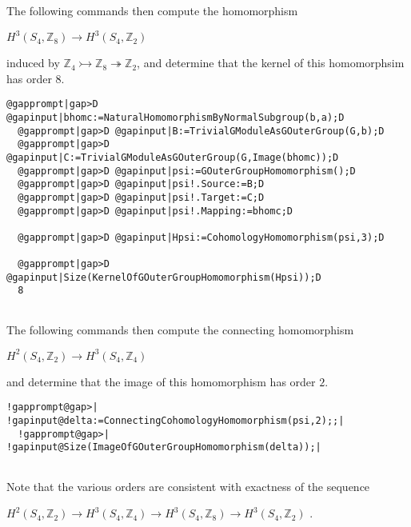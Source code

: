 \documentclass[a4paper,11pt]{report}
\begin{document}
{{\begin{Verbatim}[commandchars=@|D,fontsize=\small,frame=single,label=Example]
\end{Verbatim}
 

 The following commands then compute the homomorphism 

$H^3(S_4,\mathbb Z_8) \rightarrow H^3(S_4,\mathbb Z_2)$ 

induced by $\mathbb Z_4 \rightarrowtail \mathbb Z_8 \twoheadrightarrow \mathbb Z_2$, and determine that the kernel of this homomorphsim has order $8$. 
\begin{Verbatim}[commandchars=@|D,fontsize=\small,frame=single,label=Example]
  @gapprompt|gap>D @gapinput|bhomc:=NaturalHomomorphismByNormalSubgroup(b,a);D
  @gapprompt|gap>D @gapinput|B:=TrivialGModuleAsGOuterGroup(G,b);D
  @gapprompt|gap>D @gapinput|C:=TrivialGModuleAsGOuterGroup(G,Image(bhomc));D
  @gapprompt|gap>D @gapinput|psi:=GOuterGroupHomomorphism();D
  @gapprompt|gap>D @gapinput|psi!.Source:=B;D
  @gapprompt|gap>D @gapinput|psi!.Target:=C;D
  @gapprompt|gap>D @gapinput|psi!.Mapping:=bhomc;D
  
  @gapprompt|gap>D @gapinput|Hpsi:=CohomologyHomomorphism(psi,3);D
  
  @gapprompt|gap>D @gapinput|Size(KernelOfGOuterGroupHomomorphism(Hpsi));D
  8
  
\end{Verbatim}
 

The following commands then compute the connecting homomorphism 

$H^2(S_4,\mathbb Z_2) \rightarrow H^3(S_4,\mathbb Z_4)$ 

and determine that the image of this homomorphism has order $2$. 
\begin{Verbatim}[commandchars=!@|,fontsize=\small,frame=single,label=Example]
  !gapprompt@gap>| !gapinput@delta:=ConnectingCohomologyHomomorphism(psi,2);;|
  !gapprompt@gap>| !gapinput@Size(ImageOfGOuterGroupHomomorphism(delta));|
  
\end{Verbatim}
 Note that the various orders are consistent with exactness of the sequence 

$H^2(S_4,\mathbb Z_2) \rightarrow H^3(S_4,\mathbb Z_4) \rightarrow
H^3(S_4,\mathbb Z_8) \rightarrow H^3(S_4,\mathbb Z_2) $ . }

 
}
\end{document}
